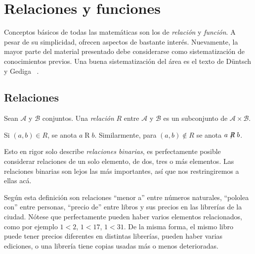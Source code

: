%

\chapter{Relaciones y funciones}
\label{cha:relaciones-funciones}

  Conceptos básicos de todas las matemáticas
  son los de \emph{relación} y \emph{función}.
  A pesar de su simplicidad,
  ofrecen aspectos de bastante interés.
  Nuevamente,
  la mayor parte del material presentado
  debe considerarse como sistematización de conocimientos previos.
  Una buena sistematización del área es el texto de Düntsch y Gediga~%
    \cite{duentsch00:_sets_relat_funct}.

\section{Relaciones}
\label{sec:relaciones}

  \begin{definition}
    Sean \(\mathcal{A}\) y \(\mathcal{B}\) conjuntos.
    Una \emph{relación} \(R\) entre \(\mathcal{A}\) y \(\mathcal{B}\)
    es un subconjunto de \(\mathcal{A} \times \mathcal{B}\).

    Si \((a, b) \in R\),
    se anota \(a \mathrel{R} b\).
    Similarmente,
    para \((a, b) \notin R\)
    se anota \(a \mathrel{\centernot R} b\).
  \end{definition}

  Esto en rigor solo describe \emph{relaciones binarias},
  es perfectamente posible considerar relaciones
  de un solo elemento, de dos, tres o más elementos.
  Las relaciones binarias son lejos las más importantes,
  así que nos restringiremos a ellas acá.

  Según esta definición son relaciones ``menor a''
  entre números naturales,
  ``pololea con'' entre personas,
  ``precio de'' entre libros y sus precios en las librerías de la ciudad.
  Nótese que perfectamente pueden haber varios elementos relacionados,
  como por ejemplo \(1 < 2\), \(1 < 17\), \(1 < 31\).
  De la misma forma,
  el mismo libro puede tener precios diferentes
  en distintas librerías,
  pueden haber varias ediciones,
  o una librería tiene copias usadas más o menos deterioradas.

